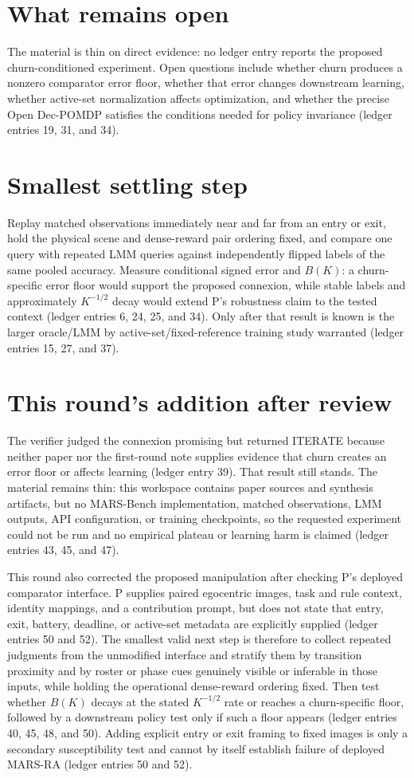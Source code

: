 \documentclass{article}
\begin{document}
\section*{What remains open}
The material is thin on direct evidence: no ledger entry reports the proposed churn-conditioned experiment.  Open questions include whether churn produces a nonzero comparator error floor, whether that error changes downstream learning, whether active-set normalization affects optimization, and whether the precise Open Dec-POMDP satisfies the conditions needed for policy invariance (ledger entries 19, 31, and 34).

\section*{Smallest settling step}
Replay matched observations immediately near and far from an entry or exit, hold the physical scene and dense-reward pair ordering fixed, and compare one query with repeated LMM queries against independently flipped labels of the same pooled accuracy.  Measure conditional signed error and \(B(K)\): a churn-specific error floor would support the proposed connexion, while stable labels and approximately \(K^{-1/2}\) decay would extend P's robustness claim to the tested context (ledger entries 6, 24, 25, and 34).  Only after that result is known is the larger oracle/LMM by active-set/fixed-reference training study warranted (ledger entries 15, 27, and 37).

\section*{This round's addition after review}
The verifier judged the connexion promising but returned ITERATE because neither
paper nor the first-round note supplies evidence that churn creates an error
floor or affects learning (ledger entry 39).  That result still stands.  The
material remains thin: this workspace contains paper sources and synthesis
artifacts, but no MARS-Bench implementation, matched observations, LMM outputs,
API configuration, or training checkpoints, so the requested experiment could
not be run and no empirical plateau or learning harm is claimed (ledger entries
43, 45, and 47).

This round also corrected the proposed manipulation after checking P's deployed
comparator interface.  P supplies paired egocentric images, task and rule
context, identity mappings, and a contribution prompt, but does not state that
entry, exit, battery, deadline, or active-set metadata are explicitly supplied
(ledger entries 50 and 52).  The smallest valid next step is therefore to
collect repeated judgments from the unmodified interface and stratify them by
transition proximity and by roster or phase cues genuinely visible or inferable
in those inputs, while holding the operational dense-reward ordering fixed.
Then test whether \(B(K)\) decays at the stated \(K^{-1/2}\) rate or reaches a
churn-specific floor, followed by a downstream policy test only if such a floor
appears (ledger entries 40, 45, 48, and 50).  Adding explicit entry or exit
framing to fixed images is only a secondary susceptibility test and cannot by
itself establish failure of deployed MARS-RA (ledger entries 50 and 52).
\end{document}
